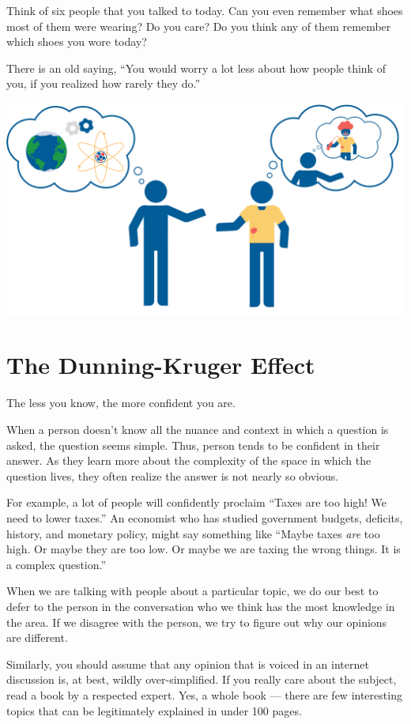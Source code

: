 Think of six people that you talked to today. Can you even remember what
shoes most of them were wearing? Do you care? Do you think any of them
remember which shoes you wore today?

There is an old saying, ``You would worry a lot less about how people
think of you, if you realized how rarely they do.''

\includegraphics[width=1\textwidth]{spotlightEffect.png}

\section{The Dunning-Kruger Effect}

The less you know, the more confident you are.

When a person doesn't know all the nuance and context in which a question is
asked, the question seems simple. Thus, person tends to be confident in
their answer. As they learn more about the complexity of the space in
which the question lives, they often realize the answer is not nearly so
obvious.

For example, a lot of people will confidently proclaim ``Taxes are too
high! We need to lower taxes.''  An economist who has studied
government budgets, deficits, history, and monetary policy, might say
something like ``Maybe taxes \emph{are} too high. Or maybe they are
too low. Or maybe we are taxing the wrong things. It is a 
complex question.''

When we are talking with people about a particular topic, we do our best
to defer to the person in the conversation who we think has the most
knowledge in the area. If we disagree with the person, we try to figure
out why our opinions are different.

Similarly, you should assume that any opinion that is voiced in an
internet discussion is, at best, wildly over-simplified. If you really care
about the subject, read a book by a respected expert. Yes, a whole
book --- there are few interesting topics that can be legitimately
explained in under 100 pages.

